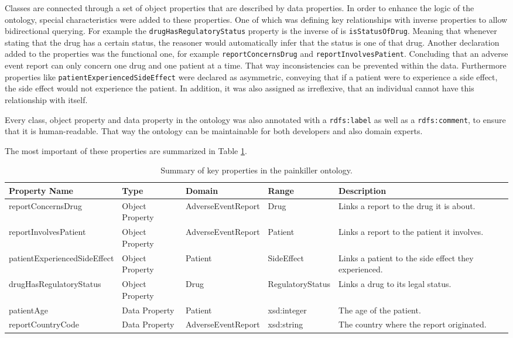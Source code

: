 Classes are connected through a set of object properties that are described by data properties. In order to enhance the logic of the ontology, special characteristics were added to these properties. One of which was defining key relationships with inverse properties to allow bidirectional querying. For example the \texttt{drugHasRegulatoryStatus} property is the inverse of is \texttt{isStatusOfDrug}. Meaning that whenever stating that the drug has a certain status, the reasoner would automatically infer that the status is one of that drug. Another declaration added to the properties was the functional one, for example \texttt{reportConcernsDrug} and \texttt{reportInvolvesPatient}. Concluding that an adverse event report can only concern one drug and one patient at a time. That way inconsistencies can be prevented within the data. Furthermore properties like \texttt{patientExperiencedSideEffect} were declared as asymmetric, conveying that if a patient were to experience a side effect, the side effect would not experience the patient. In addition, it was also assigned as irreflexive, that an individual cannot have this relationship with itself.

Every class, object property and data property in the ontology was also annotated with a \texttt{rdfs:label} as well as a \texttt{rdfs:comment}, to ensure that it is human-readable. That way the ontology can be maintainable for both developers and also domain experts.

The most important of these properties are summarized in Table \ref{tab:ontology_properties}.

\begin{table}[htbp]
\centering
\small
\begin{tabular}{|p{2.6cm}|p{1.8cm}|p{1.8cm}|p{1.8cm}|p{3.0cm}|}
\hline
\textbf{Property Name} & \textbf{Type} & \textbf{Domain} & \textbf{Range} & \textbf{Description} \\
\hline
report\-Concerns\-Drug & Object Property & Adverse\-Event\-Report & Drug & Links a report to the drug it is about. \\
\hline
report\-Involves\-Patient & Object Property & Adverse\-Event\-Report & Patient & Links a report to the patient it involves. \\
\hline
patient\-Experienced\-Side\-Effect & Object Property & Patient & Side\-Effect & Links a patient to the side effect they experienced. \\
\hline
drug\-Has\-Regulatory\-Status & Object Property & Drug & Regulatory\-Status & Links a drug to its legal status. \\
\hline
patientAge & Data Property & Patient & xsd:integer & The age of the patient. \\
\hline
report\-Country\-Code & Data Property & Adverse\-Event\-Report & xsd:string & The country where the report originated. \\
\hline
\end{tabular}
\caption{Summary of key properties in the painkiller ontology.}
\label{tab:ontology_properties}
\end{table}

